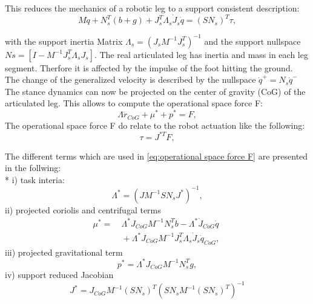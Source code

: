 \documentclass[10pt, conference]{IEEEtran}
\begin{document}
This reduces the mechanics of a robotic leg to a support consistent description:
\begin{equation}
   M \ddot{q} + {N}_{s}^{T}(b + g) + {J}_{s}^{T} {\Lambda}_{s} {\dot{J}}_{s} \dot{q} = {(S {N}_{s})}^{T} \tau,
\end{equation}

with the support inertia Matrix \({\Lambda}_{s} = {({J}_{s} {M}^{-1} {J}_{s}^{T})}^{-1}\) and the support nullspace 
\({N}{s}=[I-{M}^{-1} {J}_{s}^{T} {\Lambda}_{s} {J}_{s}]\). The real articulated leg has inertia and mass in each leg segment. Therfore it is affected 
by the impulse of the foot hitting the ground. The change of the generalized velocity is described by the nullspace \({\dot{q}}^{+}={N}_{s} {\dot{q}}^{-}\)
The stance dynamics can now be projected on the center of gravity (CoG) of the articulated leg. This allows to compute the operational space force F:
\begin{equation}
   \Lambda {\ddot{r}}_{CoG} + {\mu}^{*} + {p}^{*} = F, 
   \label{eq:operational space force F}
\end{equation}
The operational space force F do relate to the robot actuation like the following:
\begin{equation}
   \tau = {J}^{*T}F,
\end{equation}

The different terms which are used in \ref{eq:operational space force F} are presented in the follwing:\\* 
i) task interia: 
\begin{equation}
   {\Lambda}^{*} = {(J {M}^{-1} S {N}_{s} {J}^{*})}^{-1}, 
\end{equation}
ii) projected coriolis and centrifugal terms
\begin{equation}
\begin{aligned}
   {\mu}^{*} = & \ {\Lambda}^{*} {J}_{CoG} {M}^{-1} {N}_{s}^{T} b - {\Lambda}^{*} {\dot{J}}_{CoG} \dot{q} \\
   & \ + {\Lambda}^{*} {J}_{CoG} {M}^{-1} {J}_{s}^{T} {\Lambda}_{s} {\dot{J}}_{s} {\dot{q}}_{CoG},\
\end{aligned}
\end{equation}
iii) projected gravitational term
\begin{equation}
   {p}^{*} = {\Lambda}^{*} {J}_{CoG} {M}^{-1} {N}_{s}^{T} g,
\end{equation}
iv) support reduced Jacobian
\begin{equation}
   {J}^{*} = {J}_{CoG} {M}^{-1} {(S {N}_{s})}^{T} {(S {N}_{s} {M}^{-1} {(S {N}_{s})}^{T})}^{-1}
\end{equation}
\end{document}
